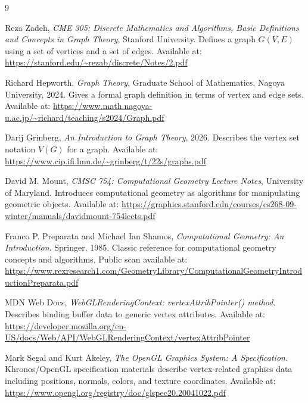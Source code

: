 \documentclass[11pt]{article}
\begin{document}
\begin{thebibliography}{9}

Reza Zadeh, \emph{CME 305: Discrete Mathematics and Algorithms, Basic Definitions and Concepts in Graph Theory}, Stanford University. Defines a graph \(G(V,E)\) using a set of vertices and a set of edges. Available at: \url{https://stanford.edu/~rezab/discrete/Notes/2.pdf}

Richard Hepworth, \emph{Graph Theory}, Graduate School of Mathematics, Nagoya University, 2024. Gives a formal graph definition in terms of vertex and edge sets. Available at: \url{https://www.math.nagoya-u.ac.jp/~richard/teaching/s2024/Graph.pdf}

Darij Grinberg, \emph{An Introduction to Graph Theory}, 2026. Describes the vertex set notation \(V(G)\) for a graph. Available at: \url{https://www.cip.ifi.lmu.de/~grinberg/t/22s/graphs.pdf}

David M. Mount, \emph{CMSC 754: Computational Geometry Lecture Notes}, University of Maryland. Introduces computational geometry as algorithms for manipulating geometric objects. Available at: \url{https://graphics.stanford.edu/courses/cs268-09-winter/manuals/davidmount-754lects.pdf}

Franco P. Preparata and Michael Ian Shamos, \emph{Computational Geometry: An Introduction}. Springer, 1985. Classic reference for computational geometry concepts and algorithms. Public scan available at: \url{https://www.rexresearch1.com/GeometryLibrary/ComputationalGeometryIntroductionPreparata.pdf}

MDN Web Docs, \emph{WebGLRenderingContext: vertexAttribPointer() method}. Describes binding buffer data to generic vertex attributes. Available at: \url{https://developer.mozilla.org/en-US/docs/Web/API/WebGLRenderingContext/vertexAttribPointer}

Mark Segal and Kurt Akeley, \emph{The OpenGL Graphics System: A Specification}. Khronos/OpenGL specification materials describe vertex-related graphics data including positions, normals, colors, and texture coordinates. Available at: \url{https://www.opengl.org/registry/doc/glspec20.20041022.pdf}

\end{thebibliography}
\end{document}
